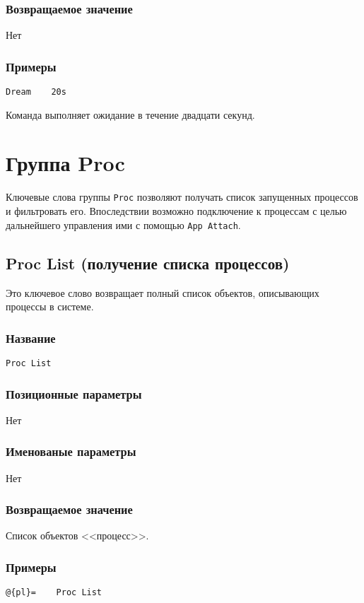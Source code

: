 \documentclass[11pt]{book} %
\begin{document}
\subsubsection*{Возвращаемое значение} 
Нет

\subsubsection*{Примеры}
\begin{verbatim}Dream    20s\end{verbatim}

Команда выполняет ожидание в течение двадцати секунд.




\section{Группа Proc}
Ключевые слова группы \verb"Proc" позволяют получать список запущенных процессов и фильтровать его. Впоследствии возможно подключение к процессам с целью дальнейшего управления ими с помощью \verb"App Attach".

\subsection{Proc List (получение списка процессов)}
Это ключевое слово возвращает полный список объектов, описывающих процессы в системе.


\subsubsection*{Название} 
\verb"Proc List"

\subsubsection*{Позиционные параметры} 
Нет

\subsubsection*{Именованые параметры} 
Нет


\subsubsection*{Возвращаемое значение} 
Список объектов <<процесс>>.

\subsubsection*{Примеры}
\begin{verbatim}@{pl}=    Proc List\end{verbatim}
\end{document}
